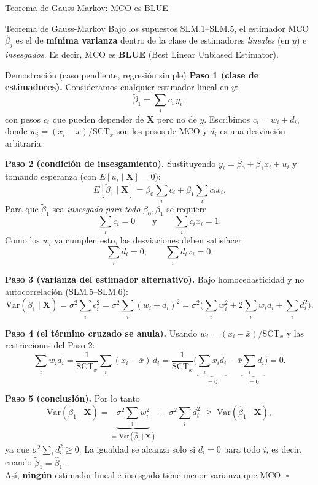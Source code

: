 \documentclass[10pt]{beamer}
\begin{document}
\begin{frame}[allowframebreaks]{Teorema de Gauss-Markov: MCO es BLUE}

\begin{alertblock}{Teorema de Gauss-Markov}
Bajo los supuestos SLM.1--SLM.5, el estimador MCO $\hat\beta_j$ es el de \textbf{mínima varianza} dentro de la clase de estimadores \emph{lineales} (en $y$) e \emph{insesgados}. Es decir, MCO es \textbf{BLUE} (Best Linear Unbiased Estimator).
\end{alertblock}

\begin{exampleblock}{Demostración (caso pendiente, regresión simple)}
\textbf{Paso 1 (clase de estimadores).} Consideramos cualquier estimador lineal en $y$:
\[
\tilde\beta_1=\sum_i c_i\, y_i,
\]
con pesos $c_i$ que pueden depender de $\mathbf{X}$ pero no de $y$. Escribimos $c_i=w_i+d_i$, donde $w_i=(x_i-\bar x)/\text{SCT}_x$ son los pesos de MCO y $d_i$ es una desviación arbitraria.

\framebreak

\textbf{Paso 2 (condición de insesgamiento).} Sustituyendo $y_i=\beta_0+\beta_1 x_i+u_i$ y tomando esperanza (con $E[u_i\mid\mathbf{X}]=0$):
\[
E[\tilde\beta_1\mid\mathbf{X}]=\beta_0\sum_i c_i+\beta_1\sum_i c_i x_i.
\]
Para que $\tilde\beta_1$ sea \emph{insesgado para todo} $\beta_0,\beta_1$ se requiere
\[
\sum_i c_i=0 \qquad\text{y}\qquad \sum_i c_i x_i=1.
\]
Como los $w_i$ ya cumplen esto, las desviaciones deben satisfacer
\[
\sum_i d_i=0, \qquad \sum_i d_i x_i=0.
\]

\framebreak

\textbf{Paso 3 (varianza del estimador alternativo).} Bajo homocedasticidad y no autocorrelación (SLM.5--SLM.6):
\[
\text{Var}(\tilde\beta_1\mid\mathbf{X})=\sigma^2\sum_i c_i^2=\sigma^2\sum_i (w_i+d_i)^2
=\sigma^2\Big(\sum_i w_i^2+2\sum_i w_i d_i+\sum_i d_i^2\Big).
\]

\textbf{Paso 4 (el término cruzado se anula).} Usando $w_i=(x_i-\bar x)/\text{SCT}_x$ y las restricciones del Paso 2:
\[
\sum_i w_i d_i=\frac{1}{\text{SCT}_x}\sum_i (x_i-\bar x)\,d_i
=\frac{1}{\text{SCT}_x}\Big(\underbrace{\sum_i x_i d_i}_{=0}-\bar x\underbrace{\sum_i d_i}_{=0}\Big)=0.
\]

\framebreak

\textbf{Paso 5 (conclusión).} Por lo tanto
\[
\text{Var}(\tilde\beta_1\mid\mathbf{X})=\underbrace{\sigma^2\sum_i w_i^2}_{=\,\text{Var}(\hat\beta_1\mid\mathbf{X})}+\;\sigma^2\sum_i d_i^2
\;\ge\; \text{Var}(\hat\beta_1\mid\mathbf{X}),
\]
ya que $\sigma^2\sum_i d_i^2\ge 0$. La igualdad se alcanza solo si $d_i=0$ para todo $i$, es decir, cuando $\tilde\beta_1=\hat\beta_1$.
\\[4pt]
Así, \textbf{ningún} estimador lineal e insesgado tiene menor varianza que MCO. \hfill $\square$
\end{exampleblock}


\end{frame}
\end{document}
